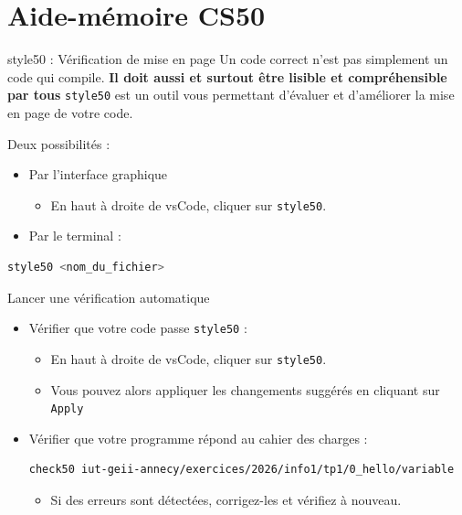 
\section{Aide-mémoire CS50}

\begin{UPSTIinfor}{style50 : Vérification de mise en page}
	Un code correct n'est pas simplement un code qui compile. \textbf{Il doit aussi et surtout être lisible et compréhensible par tous}
	\texttt{style50} est un outil vous permettant d'évaluer et d'améliorer la mise en page de votre code.

	Deux possibilités :
	\begin{itemize}
		\item Par l'interface graphique
		      \begin{itemize}
			      \item[$\Box$] En haut à droite de vsCode, cliquer sur \texttt{style50}.
		      \end{itemize}
		\item Par le terminal :
	\end{itemize}
\end{UPSTIinfor}
\begin{lstlisting}[language=bash,style=console]
style50 <nom_du_fichier>
\end{lstlisting}

\begin{UPSTIinfor}{Lancer une vérification automatique}
	\begin{itemize}
		\item[$\Box$] Vérifier que votre code passe  \texttt{style50} :
		      \begin{itemize}
			      \item[$\Box$] En haut à droite de vsCode, cliquer sur \texttt{style50}.
			      \item[$\Box$] Vous pouvez alors appliquer les changements suggérés en cliquant sur \texttt{Apply}
		      \end{itemize}
		\item[$\Box$] Vérifier que votre programme répond au cahier des charges :
		      \begin{lstlisting}[language=bash,style=console]
	check50 iut-geii-annecy/exercices/2026/info1/tp1/0_hello/variable
\end{lstlisting}
		      \begin{itemize}
			      \item[$\Box$] Si des erreurs sont détectées, corrigez-les et vérifiez à nouveau.
		      \end{itemize}
	\end{itemize}
\end{UPSTIinfor}